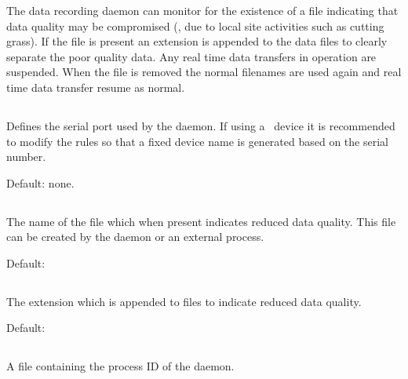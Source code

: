 The data recording daemon can monitor for the existence of a file
indicating that data quality may be compromised (\eg, due to local
site activities such as cutting grass). If the file is present an
extension is appended to the data files to clearly separate the poor
quality data. Any real time data transfers in operation are
suspended. When the file is removed the normal filenames are used
again and real time data transfer resume as normal.

\subsection{}
Defines the serial port used by the 
daemon. If using a \usb\ device it is recommended to modify the
 rules so that a fixed device name is generated based on
the serial number. 


Default: none.

\subsection{}
The name of the file which when present indicates reduced data
quality. This file can be created by the 
daemon or an external process.

Default: 

\subsection{}
The extension which is appended to files to indicate reduced data
quality.

Default: 

\subsection{}
A file containing the process ID of the 
daemon.

